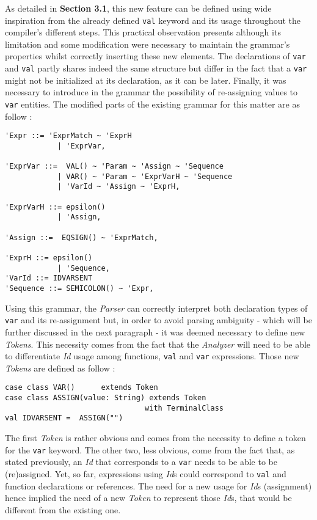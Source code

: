 As detailed in \textbf{Section 3.1}, this new feature can be defined using wide inspiration from the already defined \texttt{val} keyword and its usage throughout the compiler's different steps. This practical observation presents although its limitation and some modification were necessary to maintain the grammar's properties whilst correctly inserting these new elements. The declarations of \texttt{var} and \texttt{val} partly shares indeed the same structure but differ in the fact that a \texttt{var} might not be initialized at its declaration, as it can be later. Finally, it was necessary to introduce in the grammar the possibility of re-assigning values to \texttt{var} entities. The modified parts of the existing grammar for this matter are as follow :
\begin{lstlisting}
'Expr ::= 'ExprMatch ~ 'ExprH 
            | 'ExprVar,                       
      
'ExprVar ::=  VAL() ~ 'Param ~ 'Assign ~ 'Sequence
            | VAR() ~ 'Param ~ 'ExprVarH ~ 'Sequence
            | 'VarId ~ 'Assign ~ 'ExprH,
    
'ExprVarH ::= epsilon()
            | 'Assign,
            
'Assign ::=  EQSIGN() ~ 'ExprMatch,
            
'ExprH ::= epsilon() 
            | 'Sequence, 
'VarId ::= IDVARSENT
'Sequence ::= SEMICOLON() ~ 'Expr,                                        
\end{lstlisting}
Using this grammar, the \textit{Parser} can correctly interpret both declaration types of \texttt{var} and its re-assignment but, in order to avoid parsing ambiguity - which will be further discussed in the next paragraph - it was deemed necessary to define new \textit{Tokens}. This necessity comes from the fact that the \textit{Analyzer} will need to be able to differentiate \textit{Id} usage among functions, \texttt{val} and \texttt{var} expressions. Those new \textit{Tokens} are defined as follow :
\begin{lstlisting}
case class VAR()      extends Token
case class ASSIGN(value: String) extends Token
                                with TerminalClass
val IDVARSENT =  ASSIGN("")
\end{lstlisting}
The first \textit{Token} is rather obvious and comes from the necessity to define a token for the \texttt{var} keyword. The other two, less obvious, come from the fact that, as stated previously, an \textit{Id} that corresponds to a \texttt{var} needs to be able to be (re)assigned. Yet, so far, expressions using \textit{Id}s could correspond to \texttt{val} and function declarations or references. The need for a new usage for \textit{Id}s (assignment) hence implied the need of a new \textit{Token} to represent those \textit{Id}s, that would be different from the existing one.

